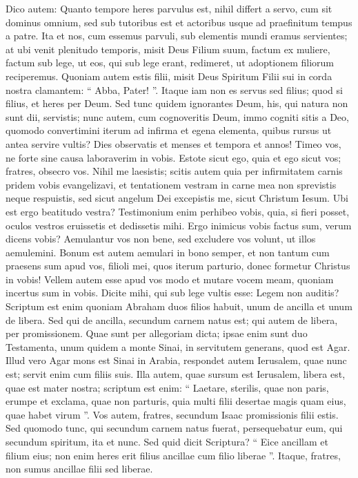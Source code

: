 \begin{biblechapter}
\begin{biblechapter}
\begin{biblechapter}
\begin{biblechapter}
\verse Dico autem: Quanto tempore heres parvulus est, nihil differt a servo, cum sit dominus omnium, 
\verse sed sub tutoribus est et actoribus usque ad praefinitum tempus a patre. 
\verse Ita et nos, cum essemus parvuli, sub elementis mundi eramus servientes; 
\verse at ubi venit plenitudo temporis, misit Deus Filium suum, factum ex muliere, factum sub lege, 
\verse ut eos, qui sub lege erant, redimeret, ut adoptionem filiorum reciperemus. 
\verse Quoniam autem estis filii, misit Deus Spiritum Filii sui in corda nostra clamantem: “ Abba, Pater! ”. 
\verse Itaque iam non es servus sed filius; quod si filius, et heres per Deum.
 \verse Sed tunc quidem ignorantes Deum, his, qui natura non sunt dii, servistis; 
 \verse nunc autem, cum cognoveritis Deum, immo cogniti sitis a Deo, quomodo convertimini iterum ad infirma et egena elementa, quibus rursus ut antea servire vultis? 
\verse Dies observatis et menses et tempora et annos! 
\verse Timeo vos, ne forte sine causa laboraverim in vobis.
 \verse Estote sicut ego, quia et ego sicut vos; fratres, obsecro vos. Nihil me laesistis; 
\verse scitis autem quia per infirmitatem carnis pridem vobis evangelizavi, 
\verse et tentationem vestram in carne mea non sprevistis neque respuistis, sed sicut angelum Dei excepistis me, sicut Christum Iesum.
 \verse Ubi est ergo beatitudo vestra? Testimonium enim perhibeo vobis, quia, si fieri posset, oculos vestros eruissetis et dedissetis mihi. 
\verse Ergo inimicus vobis factus sum, verum dicens vobis? 
\verse Aemulantur vos non bene, sed excludere vos volunt, ut illos aemulemini. 
\verse Bonum est autem aemulari in bono semper, et non tantum cum praesens sum apud vos, 
\verse filioli mei, quos iterum parturio, donec formetur Christus in vobis! 
\verse Vellem autem esse apud vos modo et mutare vocem meam, quoniam incertus sum in vobis.
 \verse Dicite mihi, qui sub lege vultis esse: Legem non auditis? 
\verse Scriptum est enim quoniam Abraham duos filios habuit, unum de ancilla et unum de libera. 
 \verse Sed qui de ancilla, secundum carnem natus est; qui autem de libera, per promissionem. 
\verse Quae sunt per allegoriam dicta; ipsae enim sunt duo Testamenta, unum quidem a monte Sinai, in servitutem generans, quod est Agar. 
 \verse Illud vero Agar mons est Sinai in Arabia, respondet autem Ierusalem, quae nunc est; servit enim cum filiis suis. 
\verse Illa autem, quae sursum est Ierusalem, libera est, quae est mater nostra; 
\verse scriptum est enim:
 “ Laetare, sterilis, quae non paris,
 erumpe et exclama, quae non parturis,
 quia multi filii desertae
 magis quam eius, quae habet virum ”.
 \verse Vos autem, fratres, secundum Isaac promissionis filii estis. 
\verse Sed quomodo tunc, qui secundum carnem natus fuerat, persequebatur eum, qui secundum spiritum, ita et nunc. 
\verse Sed quid dicit Scriptura? “ Eice ancillam et filium eius; non enim heres erit filius ancillae cum filio liberae ”. 
\verse Itaque, fratres, non sumus ancillae filii sed liberae.
 

\end{biblechapter}
\end{biblechapter}
\end{biblechapter}
\end{biblechapter}
